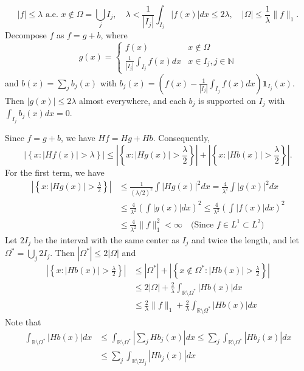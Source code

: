 $$
|f| \leq \lambda \text{ a.e. } x \notin \Omega = \bigcup_j I_j, \quad \lambda < \frac{1}{\left|I_j\right|} \int_{I_j} |f(x)| dx \leq 2\lambda, \quad |\Omega| \leq \frac{1}{\lambda} \|f\|_1.
$$
Decompose $f$ as $f = g + b$, where
$$
g(x) = \begin{cases} 
f(x) & x \notin \Omega \\
\frac{1}{\left|I_j\right|} \int_{I_j} f(x) dx & x \in I_j, j \in \mathbb{N}
\end{cases}
$$
and $b(x) = \sum_j b_j(x)$ with $b_j(x) = \left(f(x) - \frac{1}{\left|I_j\right|} \int_{I_j} f(x) dx\right) \textbf{1}_{I_j}(x)$. Then $|g(x)| \leq 2\lambda$ almost everywhere, and each $b_j$ is supported on $I_j$ with $\int_{I_j} b_j (x) dx = 0$.

Since $f = g + b$, we have $H f = H g + H b$. Consequently,
$$
\left|\left\{x: |H f(x)| > \lambda\right\}\right| \leq \left|\left\{x: |H g(x)| > \frac{\lambda}{2}\right\}\right| + \left|\left\{x: |H b(x)| > \frac{\lambda}{2}\right\}\right|.
$$
For the first term, we have
$$
\begin{aligned}
\left|\left\{x: |Hg(x)| > \frac{\lambda}{2}\right\}\right| &\leqslant \frac{1}{(\lambda/2)^2} \int |Hg(x)|^2 dx = \frac{4}{\lambda^2} \int |g(x)|^2 dx \\
&\leqslant \frac{4}{\lambda^2} \left( \int |g(x)| dx \right)^2 \leqslant \frac{4}{\lambda^2} \left( \int |f(x)| dx \right)^2 \\
&\leqslant \frac{4}{\lambda^2} \|f\|_1^2 < \infty \quad \text{(Since } f \in L^1 \subset L^2\text{)}
\end{aligned}
$$
Let $2I_j$ be the interval with the same center as $I_j$ and twice the length, and let $\Omega^* = \bigcup_j 2I_j$. Then $|\Omega^*| \leq 2|\Omega|$ and
$$
\begin{aligned}
\left|\left\{x: |Hb(x)| > \frac{\lambda}{2}\right\}\right| &\leq |\Omega^*| + \left|\left\{x \notin \Omega^*: |Hb(x)| > \frac{\lambda}{2}\right\}\right| \\
&\leq 2|\Omega| + \frac{2}{\lambda} \int_{\mathbb{R} \setminus \Omega^*}|Hb(x)| dx \\
&\leq \frac{2}{\lambda}\|f\|_1 + \frac{2}{\lambda} \int_{\mathbb{R} \setminus \Omega^*}|Hb(x)| dx
\end{aligned}
$$
Note that
$$
\begin{aligned}
\int_{\mathbb{R} \setminus \Omega^*}|Hb(x)| dx &\leq \int_{\mathbb{R} \setminus \Omega^*}\left|\sum_j Hb_j(x)\right| dx \leq \sum_j \int_{\mathbb{R} \setminus \Omega^*}|Hb_j(x)| dx \\
&\leq \sum_j \int_{\mathbb{R} \setminus 2I_j}|Hb_j(x)| dx
\end{aligned}
$$
